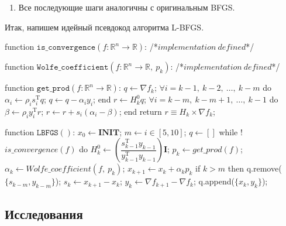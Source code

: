 \documentclass[12pt, a4paper, oneside, final]{article}
\begin{document}
\begin{enumerate}[1)]
		Из всего вышеописанного мы можем провести произведение $H_{k} \times \nabla{f_{k}}$ более эффективно следующим образом
		\begin{lstlisting}
$q \gets \nabla{f_{k}}$;
$\forall i = k - 1, ~ k - 2, ~ \ldots, ~ k - m$ do
	$\alpha_{i} \gets \rho_{i}s_{i}^{\mathrm{T}}q$;
	$q \gets q - \alpha_{i}y_{i}$;
end
$r \gets H_{k}^{0}q$;
$\forall i = k - m, ~ k - m + 1, ~ \ldots, ~ k - 1$ do
	$\beta \gets \rho_{i}y_{i}^{\mathrm{T}}r$;
	$r \gets r + s_i(\alpha_i - \beta)$;
end
return $r \equiv H_k \times \nabla{f_{k}}$;
		\end{lstlisting}
		Получение нового на данной итерации $H_{k}^{0}$ мы также сильно ускорим, лишь приблизив наши значения, используя формулу $H_{k}^{0} = \gamma_{k}\mathbf{I}$, где
		\[
			\gamma_{k} = \dfrac{s_{k - 1}^{\mathrm{T}}y_{k - 1}}{y_{k - 1}^{\mathrm{T}}y_{k - 1}}
		\]
		\item Все последующие шаги аналогичны с оригинальным BFGS.
	\end{enumerate}
	Итак, напишем идейный псевдокод алгоритма L-BFGS.
	\begin{mylisting}
function $\mathtt{is\_convergence}(f : \mathbb{R}^{n} \to \mathbb{R})$:
	/*$implementation~defined$*/

function $\mathtt{Wolfe\_coefficient}(f : \mathbb{R}^{n} \to \mathbb{R}, ~ p_{k})$:
	/*$implementation~defined$*/

function $\mathtt{get\_prod}(f : \mathbb{R}^{n} \to \mathbb{R})$:
	$q \gets \nabla{f_{k}}$;
	$\forall i = k - 1, ~ k - 2, ~ \ldots, ~ k - m$ do
		$\alpha_{i} \gets \rho_{i}s_{i}^{\mathrm{T}}q$;
		$q \gets q - \alpha_{i}y_{i}$;
	end
	$r \gets H_{k}^{0}q$;
	$\forall i = k - m, ~ k - m + 1, ~ \ldots, ~ k - 1$ do
		$\beta \gets \rho_{i}y_{i}^{\mathrm{T}}r$;
		$r \gets r + s_i(\alpha_i - \beta)$;
	end
	return $r \equiv H_k \times \nabla{f_{k}}$;
	
function $\mathtt{LBFGS}()$:
	$x_{0} \gets \mathbf{INIT}$;
	$m \gets i \in [5, 10]$;
	$q \gets []$
	while !$is\_convergence(f)$ do
		$H_{k}^{0} \gets \left(\dfrac{s_{k - 1}^{\mathrm{T}}y_{k - 1}}{y_{k - 1}^{\mathrm{T}}y_{k - 1}}\right)\mathbf{I}$;
		$p_{k} \gets get\_prod(f)$;
		$\alpha_{k} \gets Wolfe\_coefficient(f, ~ p_{k})$;
		$x_{k + 1} \gets x_{k} + \alpha_{k}p_{k}$
		if $k > m$ then
			q.remove($\{s_{k - m}, y_{k - m}\}$);
		$s_{k} \gets x_{k + 1} - x_{k}$;
		$y_{k} \gets \nabla{f_{k + 1}} - \nabla{f_{k}}$;
		q.append($\{x_{k}, y_{k}\}$);
	\end{mylisting}
	\subsection*{Исследования}
\end{document}
